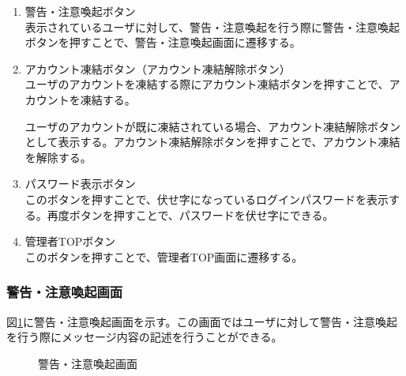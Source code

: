 \documentclass[a4j]{jarticle}
\begin{document}
\begin{enumerate}
  \renewcommand{\labelenumi}{\textcircled{\scriptsize \theenumi}}

\item 警告・注意喚起ボタン\\
表示されているユーザに対して、警告・注意喚起を行う際に警告・注意喚起ボタンを押すことで、警告・注意喚起画面に遷移する。
\item アカウント凍結ボタン（アカウント凍結解除ボタン）\\
  ユーザのアカウントを凍結する際にアカウント凍結ボタンを押すことで、アカウントを凍結する。

  ユーザのアカウントが既に凍結されている場合、アカウント凍結解除ボタンとして表示する。アカウント凍結解除ボタンを押すことで、アカウント凍結を解除する。
  \item パスワード表示ボタン\\
  このボタンを押すことで、伏せ字になっているログインパスワードを表示する。再度ボタンを押すことで、パスワードを伏せ字にできる。
  \item 管理者TOPボタン\\
  このボタンを押すことで、管理者TOP画面に遷移する。

\end{enumerate}

\subsubsection{警告・注意喚起画面}
図\ref{fig:warning}に警告・注意喚起画面を示す。この画面ではユーザに対して警告・注意喚起を行う際にメッセージ内容の記述を行うことができる。

\begin{figure}[H]
\centering
{}
\caption{警告・注意喚起画面}
\label{fig:warning}
\end{figure}
\end{document}
